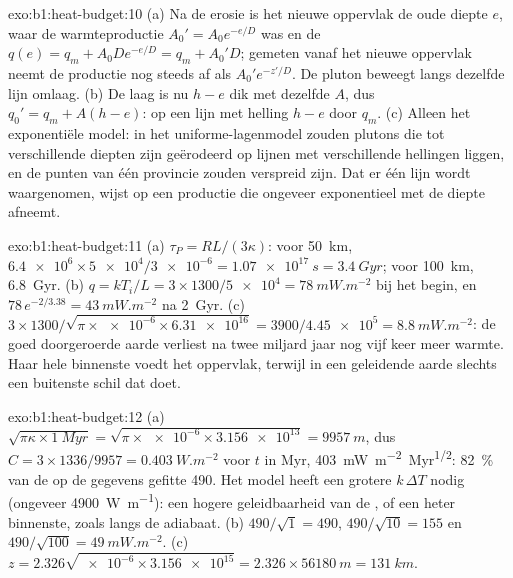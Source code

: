 \begin{solution}{exo:b1:heat-budget:10}
(a) Na de erosie is het nieuwe oppervlak de oude diepte $e$, waar de warmteproductie $A_0' = A_0e^{-e/D}$ was en de  $q(e) = q_m +
A_0De^{-e/D} = q_m + A_0'D$; gemeten vanaf het nieuwe oppervlak neemt de productie nog steeds af als $A_0'e^{-z'/D}$. De pluton beweegt langs dezelfde lijn omlaag.
(b) De laag is nu $h - e$ dik met dezelfde $A$, dus $q_0' = q_m + A(h - e)$:
op een lijn met helling $h - e$ door $q_m$. (c) Alleen het exponentiële model: in het uniforme-lagenmodel zouden plutons die tot verschillende diepten zijn geërodeerd op lijnen met verschillende hellingen liggen, en de punten van één provincie zouden verspreid zijn. Dat er één lijn wordt waargenomen, wijst op een productie die ongeveer exponentieel met de diepte afneemt.
\end{solution}

\begin{solution}{exo:b1:heat-budget:11}
(a) $\tau_P = RL/(3\kappa)$: voor \qty{50}{km}, $\num{6.4e6}\times\num{5e4}/\num{3e-6}
= \qty{1.07e17}{s} = \qty{3.4}{Gyr}$; voor \qty{100}{km}, \qty{6.8}{Gyr}.
(b) $q = kT_i/L = 3\times1300/\num{5e4} = \qty{78}{mW.m^{-2}}$ bij het begin,
en $78\,e^{-2/3.38} = \qty{43}{mW.m^{-2}}$ na \qty{2}{Gyr}. (c)
$3\times1300/\sqrt{\pi\times\num{e-6}\times\num{6.31e16}} = 3900/\num{4.45e5} =
\qty{8.8}{mW.m^{-2}}$: de goed doorgeroerde aarde verliest na twee miljard jaar nog vijf keer meer warmte. Haar hele binnenste voedt het oppervlak, terwijl in een geleidende aarde slechts een buitenste schil dat doet.
\end{solution}

\begin{solution}{exo:b1:heat-budget:12}
(a) $\sqrt{\pi\kappa\times\qty{1}{Myr}} = \sqrt{\pi\times\num{e-6}\times\num{3.156e13}}
= \qty{9957}{m}$, dus $C = 3\times1336/9957 = \qty{0.403}{W.m^{-2}}$ voor
$t$ in Myr, \qty{403}{mW.m^{-2}.Myr^{1/2}}: \qty{82}{\percent} van de op de gegevens gefitte
490. Het model heeft een grotere $k\,\Delta T$ nodig (ongeveer \qty{4900}{W.m^{-1}}): een hogere geleidbaarheid van de , of een heter binnenste, zoals langs de adiabaat.
(b) $490/\sqrt1 = 490$, $490/\sqrt{10} = 155$ en $490/\sqrt{100} =
\qty{49}{mW.m^{-2}}$. (c) $z = 2.326\sqrt{\num{e-6}\times\num{3.156e15}} =
2.326\times\qty{56180}{m} = \qty{131}{km}$.
\end{solution}

